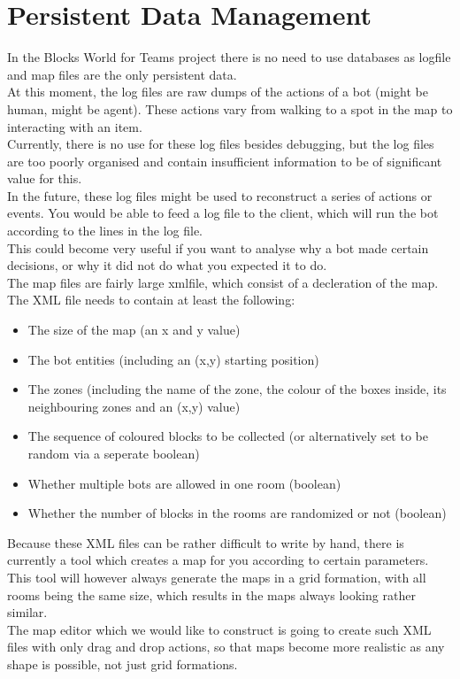 \section{Persistent Data Management}
In the Blocks World for Teams project there is no need to use databases as \gls{logfile} and map files are the only persistent data.\\

At this moment, the log files are raw dumps of the actions of a bot (might be human, might be agent). These actions vary from walking to a spot in the map to interacting with an item. \\
Currently, there is no use for these log files besides \gls{debugging}, but the log files are too poorly organised and contain insufficient information to be of significant value for this. \\
In the future, these log files might be used to reconstruct a series of actions or events. You would be able to feed a log file to the client, which will run the bot according to the lines in the log file. \\
This could become very useful if you want to analyse why a bot made certain decisions, or why it did not do what you expected it to do. \\

The map files are fairly large \gls{xmlfile}, which consist of a decleration of the map. \\
The XML file needs to contain at least the following:
\begin{itemize}
\item The size of the map (an x and y value)
\item The bot entities (including an (x,y) starting position)
\item The zones (including the name of the zone, the colour of the boxes inside, its neighbouring zones and an (x,y) value)
\item The sequence of coloured blocks to be collected (or alternatively set to be random via a seperate boolean)
\item Whether multiple bots are allowed in one room (boolean)
\item Whether the number of blocks in the rooms are randomized or not (boolean)
\end{itemize}

Because these XML files can be rather difficult to write by hand, there is currently a tool which creates a map for you according to certain parameters. This tool will however always generate the maps in a grid formation, with all rooms being the same size, which results in the maps always looking rather similar. \\
The map editor which we would like to construct is going to create such XML files with only drag and drop actions, so that maps become more realistic as any shape is possible, not just grid formations.